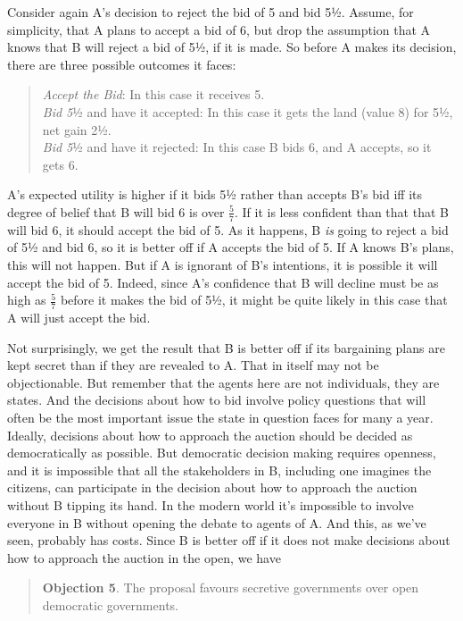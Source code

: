 \documentclass[
  11pt,
  letterpaper,
  DIV=11,
  numbers=noendperiod,
  twoside]{scrartcl}
\begin{document}
Consider again A's decision to reject the bid of 5 and bid 5½. Assume,
for simplicity, that A plans to accept a bid of 6, but drop the
assumption that A knows that B will reject a bid of 5½, if it is made.
So before A makes its decision, there are three possible outcomes it
faces:

\begin{quote}
\emph{Accept the Bid}: In this case it receives 5.\\
\emph{Bid 5}½ and have it accepted: In this case it gets the land (value
8) for 5½, net gain 2½.\\
\emph{Bid 5}½ and have it rejected: In this case B bids 6, and A
accepts, so it gets 6.
\end{quote}

A's expected utility is higher if it bids 5½ rather than accepts B's bid
iff its degree of belief that B will bid 6 is over \(\frac{5}{7}\). If
it is less confident than that that B will bid 6, it should accept the
bid of 5. As it happens, B \emph{is} going to reject a bid of 5½ and bid
6, so it is better off if A accepts the bid of 5. If A knows B's plans,
this will not happen. But if A is ignorant of B's intentions, it is
possible it will accept the bid of 5. Indeed, since A's confidence that
B will decline must be as high as \(\frac{5}{7}\) before it makes the
bid of 5½, it might be quite likely in this case that A will just accept
the bid.

Not surprisingly, we get the result that B is better off if its
bargaining plans are kept secret than if they are revealed to A. That in
itself may not be objectionable. But remember that the agents here are
not individuals, they are states. And the decisions about how to bid
involve policy questions that will often be the most important issue the
state in question faces for many a year. Ideally, decisions about how to
approach the auction should be decided as democratically as possible.
But democratic decision making requires openness, and it is impossible
that all the stakeholders in B, including one imagines the citizens, can
participate in the decision about how to approach the auction without B
tipping its hand. In the modern world it's impossible to involve
everyone in B without opening the debate to agents of A. And this, as
we've seen, probably has costs. Since B is better off if it does not
make decisions about how to approach the auction in the open, we have

\begin{quote}
\textbf{Objection 5}. The proposal favours secretive governments over
open democratic governments.
\end{quote}
\end{document}
